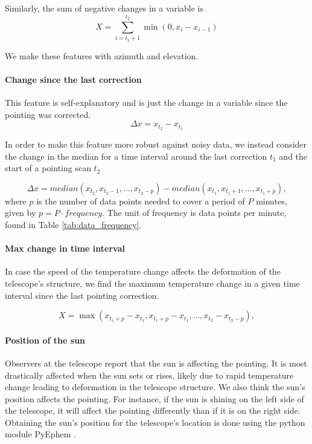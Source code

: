 Similarly, the sum of negative changes in a variable is
\begin{equation}\label{eq:negative_int}
    X = \sum_{i=t_1+1}^{t_2} \min(0, x_i-x_{i-1})
\end{equation}

We make these features with azimuth and elevation.

\paragraph{Change since the last correction}
This feature is self-explanatory and is just the change in a variable since the pointing was corrected.
\begin{equation}
    \Delta x = x_{t_2} - x_{t_1}
\end{equation}

In order to make this feature more robust against noisy data,
we instead consider the change in the median for a time interval around the last correction $t_1$ and the start of a pointing scan $t_2$

\begin{equation}
    \Delta x = \textit{median}(x_{t_2}, x_{t_2 - 1}, \dots, x_{t_2- p}) - \textit{median}(x_{t_1}, x_{t_1 + 1}, \dots, x_{t_1 + p}),
\end{equation}
where $p$ is the number of data points needed to cover a period of $P$ minutes, given by $p = P \cdot frequency$. The unit of frequency is data points per minute, found in Table \ref{tab:data_frequency}.

\paragraph{Max change in time interval}
In case the speed of the temperature change affects the deformation of the telescope's structure, we find the maximum temperature change in a given time interval since the last pointing correction.

\begin{equation}
    X = \max (x_{t_1+p} - x_{t_1}, x_{t_1+p} - x_{t_1}, \dots, x_{t_2} - x_{t_2-p}),
\end{equation}


\paragraph{Position of the sun}
Observers at the telescope report that the sun is affecting the pointing.
It is most drastically affected when the sun sets or rises, likely due to rapid temperature change leading to deformation in the telescope structure.
We also think the sun's position affects the pointing.
For instance, if the sun is shining on the left side of the telescope, it will affect the pointing differently than if it is on the right side.
Obtaining the sun's position for the telescope's location is done using the python module PyEphem \cite{ephem}.

